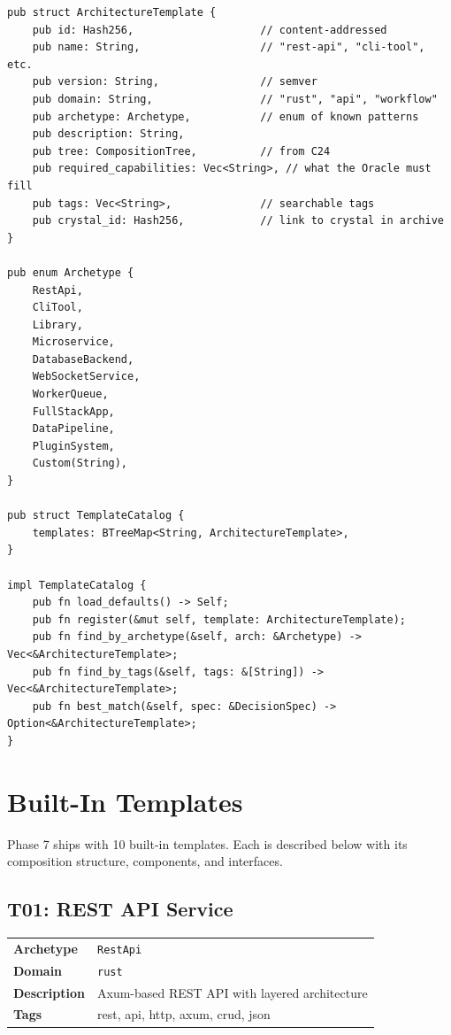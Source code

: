 \documentclass[11pt,a4paper,twoside]{article}
\theoremstyle{definition}
\theoremstyle{plain}
\theoremstyle{remark}
\begin{document}
\begin{lstlisting}[title={Template Structure}]
pub struct ArchitectureTemplate {
    pub id: Hash256,                    // content-addressed
    pub name: String,                   // "rest-api", "cli-tool", etc.
    pub version: String,                // semver
    pub domain: String,                 // "rust", "api", "workflow"
    pub archetype: Archetype,           // enum of known patterns
    pub description: String,
    pub tree: CompositionTree,          // from C24
    pub required_capabilities: Vec<String>, // what the Oracle must fill
    pub tags: Vec<String>,              // searchable tags
    pub crystal_id: Hash256,            // link to crystal in archive
}

pub enum Archetype {
    RestApi,
    CliTool,
    Library,
    Microservice,
    DatabaseBackend,
    WebSocketService,
    WorkerQueue,
    FullStackApp,
    DataPipeline,
    PluginSystem,
    Custom(String),
}

pub struct TemplateCatalog {
    templates: BTreeMap<String, ArchitectureTemplate>,
}

impl TemplateCatalog {
    pub fn load_defaults() -> Self;
    pub fn register(&mut self, template: ArchitectureTemplate);
    pub fn find_by_archetype(&self, arch: &Archetype) -> Vec<&ArchitectureTemplate>;
    pub fn find_by_tags(&self, tags: &[String]) -> Vec<&ArchitectureTemplate>;
    pub fn best_match(&self, spec: &DecisionSpec) -> Option<&ArchitectureTemplate>;
}
\end{lstlisting}


\section{Built-In Templates}\label{sec:builtin}

Phase 7 ships with 10 built-in templates. Each is described below
with its composition structure, components, and interfaces.

\subsection{T01: REST API Service}\label{sec:t01}

\begin{tabularx}{\textwidth}{l X}
\toprule
\textbf{Archetype} & \texttt{RestApi} \\
\textbf{Domain} & \texttt{rust} \\
\textbf{Description} & Axum-based REST API with layered architecture \\
\textbf{Tags} & rest, api, http, axum, crud, json \\
\bottomrule
\end{tabularx}
\end{document}
